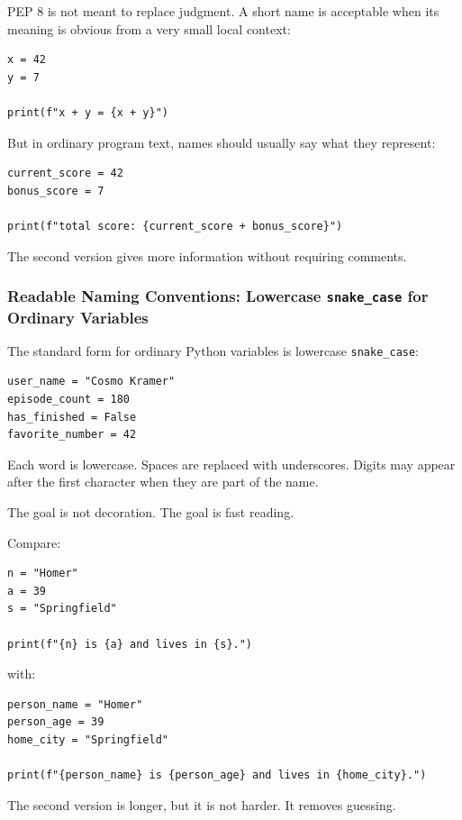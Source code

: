 PEP 8 is not meant to replace judgment. A short name is acceptable when its meaning is obvious from a very small local context:

\begin{verbatim}
x = 42
y = 7

print(f"x + y = {x + y}")
\end{verbatim}

But in ordinary program text, names should usually say what they represent:

\begin{verbatim}
current_score = 42
bonus_score = 7

print(f"total score: {current_score + bonus_score}")
\end{verbatim}

The second version gives more information without requiring comments.

\subsubsection{Readable Naming Conventions: Lowercase \texttt{snake\_case} for Ordinary Variables}

The standard form for ordinary Python variables is lowercase \texttt{snake\_case}:

\begin{verbatim}
user_name = "Cosmo Kramer"
episode_count = 180
has_finished = False
favorite_number = 42
\end{verbatim}

Each word is lowercase. Spaces are replaced with underscores. Digits may appear after the first character when they are part of the name.

The goal is not decoration. The goal is fast reading.

Compare:

\begin{verbatim}
n = "Homer"
a = 39
s = "Springfield"

print(f"{n} is {a} and lives in {s}.")
\end{verbatim}

with:

\begin{verbatim}
person_name = "Homer"
person_age = 39
home_city = "Springfield"

print(f"{person_name} is {person_age} and lives in {home_city}.")
\end{verbatim}

The second version is longer, but it is not harder. It removes guessing.

